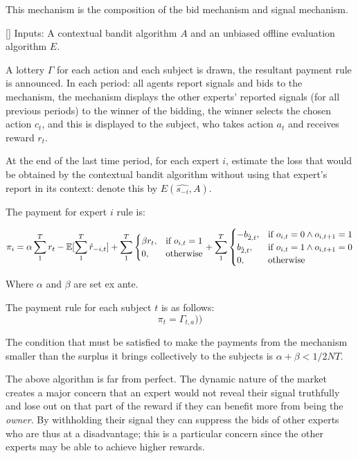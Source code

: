 This mechanism is the composition of the bid mechanism and signal mechanism.


\begin{mech}\label{mech:bidbandit}[]
Inputs: A contextual bandit algorithm $A$ and an unbiased offline evaluation algorithm $E$.


A lottery $\Gamma$ for each action and each subject is drawn, the resultant payment rule is announced.
 In each period: all agents report signals and bids to the mechanism, the mechanism displays the other experts' reported signals (for all previous periods) to the winner of the bidding, the winner selects the chosen action $c_t$, and this is displayed to the subject, who takes action $a_t$ and receives reward $r_t$.

At the end of the last time period, for each expert $i$, estimate the loss that would be obtained by the contextual bandit algorithm without using that expert's report in its context: denote this by $E(\hat{s_{-i}},A)$.

The payment for expert $i$ rule is:

\[
    \pi_i = 
\alpha \sum_1^T r_t -  \expec[\sum_1^T \hat{r}_{-i,t}]
+
\sum_1^T
\begin{cases}
    \beta r_t ,& \text{if } o_{i,t} = 1\\
     0,              & \text{otherwise}
\end{cases}
+
\sum_1^T
\begin{cases}
     - b_{\hat{2},t} ,& \text{if } o_{i,t} = 0 \land o_{i,t+1} = 1\\
       b_{\hat{2},t} ,& \text{if } o_{i,t} = 1 \land o_{i,t+1} = 0 \\
	   0,              & \text{otherwise}
\end{cases}
\]

Where $\alpha$ and $\beta$ are set ex ante. 


The payment rule for each subject $t$ is as follows:
\[
    \pi_t =  \Gamma_{t,a}))
\]

\end{mech}


The condition that must be satisfied to make the payments from the mechanism smaller than the surplus it brings collectively to the subjects is $ \alpha + \beta < 1/2NT$.


The above algorithm is far from perfect.
The dynamic nature of the market creates a major concern that an expert would not reveal their signal truthfully and lose out on that part of the reward if they can benefit more from being the \emph{owner}.
By withholding their signal they can suppress the bids of other experts who are thus at a disadvantage; this is a particular concern since the other experts may be able to achieve higher rewards.


